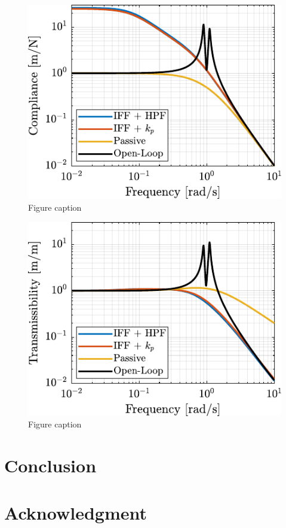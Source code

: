 \documentclass{ISMA_USD2020}
\begin{document}
\begin{figure}[htbp]
\centering
\includegraphics[scale=1]{figs/comp_compliance.pdf}
\caption{\label{fig:comp_compliance}Figure caption}
\end{figure}

\begin{figure}[htbp]
\centering
\includegraphics[scale=1]{figs/comp_transmissibility.pdf}
\caption{\label{fig:comp_transmissibility}Figure caption}
\end{figure}

\section{Conclusion}
\label{sec:org1624a6b}
\label{sec:conclusion}


\section*{Acknowledgment}
\label{sec:org1b29790}


\end{document}
